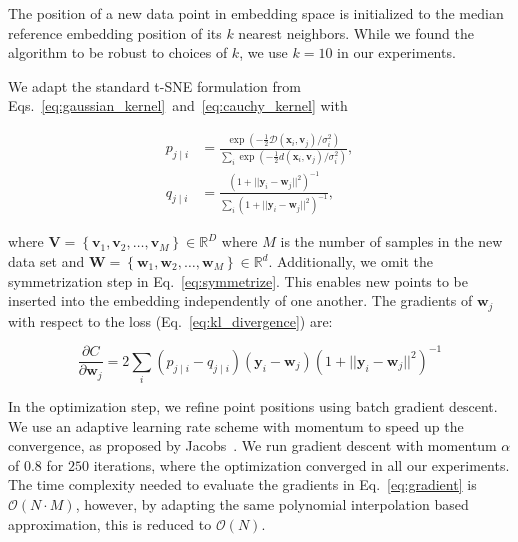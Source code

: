 \documentclass[runningheads]{llncs}
\begin{document}
The position of a new data
point in embedding space is initialized 
to the median reference embedding position of its $k$ nearest 
neighbors. While we found the algorithm to be
robust to choices of $k$, we use $k=10$ in our experiments.

We adapt the standard t-SNE formulation from
Eqs.~\ref{eq:gaussian_kernel}~and~\ref{eq:cauchy_kernel} with

\begin{align}
p_{j \mid i} &= \frac{\exp \left ( -\frac{1}{2} \mathcal{D}(\mathbf{x}_i, \mathbf{v}_j) / \sigma_i^2 \right )}{\sum_{i} \exp \left ( -\frac{1}{2} d(\mathbf{x}_i, \mathbf{v}_j) / \sigma_i^2 \right )}, \\
q_{j \mid i} &= \frac{\left ( 1 + || \mathbf{y}_i - \mathbf{w}_j ||^2 \right )^{-1}}{\sum_{i}\left ( 1 + || \mathbf{y}_i - \mathbf{w}_j ||^2 \right )^{-1}},
\end{align}

\noindent where $\mathbf{V} = \left \{ \mathbf{v}_1, \mathbf{v}_2, \dots,
\mathbf{v}_M \right \} \in \mathbb{R}^D$ where $M$ is the number of samples in
the new data set and $\mathbf{W} = \left \{ \mathbf{w}_1, \mathbf{w}_2, \dots,
\mathbf{w}_M \right \} \in \mathbb{R}^d$. Additionally, we omit the
symmetrization step in Eq.~\ref{eq:symmetrize}. This enables new points to be
inserted into the embedding independently of one another. The gradients of
$\mathbf{w}_j$ with respect to the loss (Eq.~\ref{eq:kl_divergence}) are:

\begin{equation}
\frac{\partial C}{\partial \mathbf{w}_j} = 2 \sum_i \left ( p_{j \mid i} - q_{j \mid i} \right ) \left ( \mathbf{y}_i - \mathbf{w}_j \right ) \left ( 1 + || \mathbf{y}_i - \mathbf{w}_j || ^2 \right )^{-1}
\label{eq:gradient}
\end{equation}

In the optimization step, we refine point positions using batch gradient
descent. We use an adaptive learning rate scheme with momentum 
to speed up the convergence, as proposed by Jacobs~\cite{momentum,bh_tsne}. We run gradient descent
with momentum $\alpha$ of $0.8$ for $250$ iterations, where the
optimization converged in all our experiments. The time complexity
needed to evaluate the gradients in Eq.~\ref{eq:gradient} is $\mathcal{O}(N
\cdot M)$, however, by adapting the same polynomial interpolation based
approximation, this is reduced to $\mathcal{O}(N)$.
\end{document}
